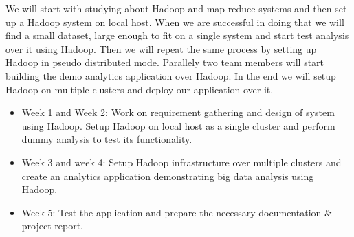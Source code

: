 We will start with studying about Hadoop and map reduce systems and then  set
up a Hadoop system on local host. When we are successful in doing that we will
find a small dataset, large enough to fit on a single system and start test
analysis over it using Hadoop. Then we will repeat the same process by setting
up Hadoop in pseudo distributed mode. Parallely two team members will start
building the demo analytics application over Hadoop. In the end we will setup
Hadoop on multiple clusters and deploy our application over it.

\begin{itemize}
  \item Week 1 and Week 2: Work on requirement gathering and design of system
    using Hadoop. Setup Hadoop on local host as a single cluster and perform
    dummy analysis to test its functionality.
  \item Week 3 and week 4: Setup Hadoop infrastructure over multiple clusters
    and create an analytics application demonstrating big data analysis using
    Hadoop.
  \item Week 5: Test the application and prepare the necessary documentation \&
    project report.
\end{itemize}
